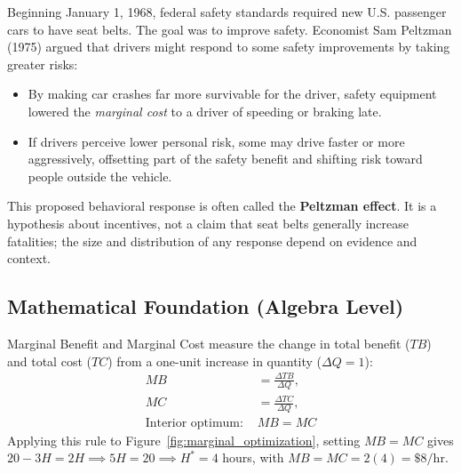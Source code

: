 \documentclass[11pt,letterpaper]{article}
\begin{document}
\begin{tcolorbox}[colback=CourseTeal!8!white,colframe=CourseTeal!80!black,title=\textbf{Bring It Home: Seatbelt Laws and the Peltzman Effect}]
Beginning January 1, 1968, federal safety standards required new U.S. passenger cars to have seat belts. The goal was to improve safety. Economist Sam Peltzman (1975) argued that drivers might respond to some safety improvements by taking greater risks:
\begin{itemize}
    \item By making car crashes far more survivable for the driver, safety equipment lowered the \emph{marginal cost} to a driver of speeding or braking late.
    \item If drivers perceive lower personal risk, some may drive faster or more aggressively, offsetting part of the safety benefit and shifting risk toward people outside the vehicle.
\end{itemize}
This proposed behavioral response is often called the \textbf{Peltzman effect}. It is a hypothesis about incentives, not a claim that seat belts generally increase fatalities; the size and distribution of any response depend on evidence and context.
\end{tcolorbox}

\subsection*{Mathematical Foundation (Algebra Level)}
Marginal Benefit and Marginal Cost measure the change in total benefit ($TB$) and total cost ($TC$) from a one-unit increase in quantity ($\Delta Q = 1$):
\begin{equation}
\begin{aligned}
MB &= \frac{\Delta TB}{\Delta Q}, \\
MC &= \frac{\Delta TC}{\Delta Q}, \\
\text{Interior optimum: } & MB = MC
\end{aligned}
\end{equation}
Applying this rule to Figure~\ref{fig:marginal_optimization}, setting $MB = MC$ gives $20 - 3H = 2H \implies 5H = 20 \implies H^* = 4$ hours, with $MB = MC = 2(4) = \$8/\text{hr}$.
\end{document}
